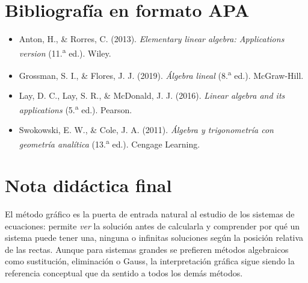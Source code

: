 \documentclass[12pt]{article}
\begin{document}
\section{Bibliografía en formato APA}

\begin{itemize}
  \item Anton, H., \& Rorres, C. (2013). \textit{Elementary linear algebra: Applications version} (11.\textsuperscript{a} ed.). Wiley.
  \item Grossman, S. I., \& Flores, J. J. (2019). \textit{Álgebra lineal} (8.\textsuperscript{a} ed.). McGraw-Hill.
  \item Lay, D. C., Lay, S. R., \& McDonald, J. J. (2016). \textit{Linear algebra and its applications} (5.\textsuperscript{a} ed.). Pearson.
  \item Swokowski, E. W., \& Cole, J. A. (2011). \textit{Álgebra y trigonometría con geometría analítica} (13.\textsuperscript{a} ed.). Cengage Learning.
\end{itemize}

\section{Nota didáctica final}

El método gráfico es la puerta de entrada natural al estudio de los sistemas de ecuaciones: permite \emph{ver} la solución antes de calcularla y comprender por qué un sistema puede tener una, ninguna o infinitas soluciones según la posición relativa de las rectas. Aunque para sistemas grandes se prefieren métodos algebraicos como sustitución, eliminación o Gauss, la interpretación gráfica sigue siendo la referencia conceptual que da sentido a todos los demás métodos.
\end{document}
